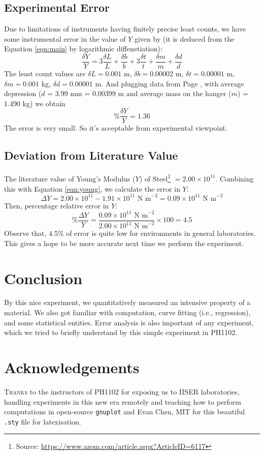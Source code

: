 \documentclass[11pt]{scrartcl}
\begin{document}
\subsection{Experimental Error}
Due to limitations of instruments having finitely precise least counts, we have some instrumental error in the value of \(Y\) given by (it is deduced from the Equation \ref{eqn:main} by logarithmic diffenetiation): 
\begin{equation*}
    \frac{\delta Y}{Y} = 3\frac{\delta L}{L} + \frac{\delta b}{b} + 3\frac{\delta t}{t} + \frac{\delta m}{m} + \frac{\delta d}{d}
\end{equation*}
The least count values are \(\delta L = 0.001\) m, \(\delta b = 0.00002\) m, \(\delta t = 0.00001\) m, \(\delta m = 0.001\) kg, \(\delta d = 0.00001\) m. And plugging data from Page \pageref{eqn:young}, with average depression (\(d\) = 3.99 mm = 0.00399 m and average mass on the hanger (\(m\)) = 1.490 kg) we obtain 
\begin{equation}
    \boxed{\%\frac{\delta Y}{Y} = 1.36}
\end{equation}
The error is very small. So it's acceptable from experimental viewpoint.

\subsection{Deviation from Literature Value}
The literature value of Young's Modulus (\(Y\)) of Steel\footnote{Source: \url{https://www.azom.com/article.aspx?ArticleID=6117}} \(= 2.00 \times 10^{11}\). Combining this with Equation \ref{eqn:young}, we calculate the error in \(Y\): \[\Delta Y = 2.00 \times 10^{11} - 1.91 \times 10^{11} \text{ N m}^{-2} = 0.09 \times 10^{11} \text{ N m}^{-2} \]
Then, percentage relative error in \(Y\): 
\begin{equation}
    \% \frac{\Delta Y}{Y} = \frac{0.09 \times 10^{11} \text{ N m}^{-2}}{2.00 \times 10^{11} \text{ N m}^{-2}} \times 100 = \boxed{4.5}
\end{equation}
Observe that, \(4.5 \%\) of error is quite low for environments in general laboratories. This gives a hope to be more accurate next time we perform the experiment.

\section{Conclusion}
By this nice experiment, we quantitatively measured an intensive property of a material. We also got familiar with computation, curve fitting (i.e., regression), and some statistical entities. Error analysis is also important of any experiment, which we tried to briefly understand by this simple experiment in PH1102.

\section{Acknowledgements}
\textsc{Thanks} to the instructors of PH1102 for exposing us to IISER laboratories, handling experiments in this new era remotely and teaching how to perform computations in open-source \texttt{gnuplot} and Evan Chen, MIT for this beautiful \texttt{.sty} file for latexisation.
\end{document}
